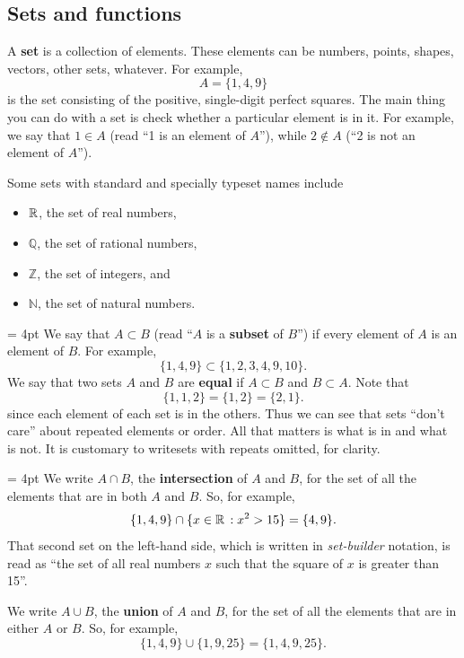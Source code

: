 \documentclass[prettycode,shellescape]{watsonbook}
\begin{document}
\subsection{Sets and functions}  \label{a:setsandfunctions}

A \textbf{set} is a collection of elements. These elements can be
numbers, points, shapes, vectors, other sets, whatever. For example,
\[
  A = \{1,4,9\} 
\]
is the set consisting of the positive, single-digit perfect
squares. The main thing you can do with a set is check whether a
particular element is in it. For example, we say that $1 \in A$ (read
``1 is an element of $A$''), while $2 \notin A$ (``2 is not an element
of $A$'').

\vspace{-8pt}

Some sets with standard and specially typeset names include 
\begin{itemize}[topsep=-6pt]
\item $\mathbb{R}$, the set of real numbers, 
\item $\mathbb{Q}$, the set of rational numbers, 
\item $\mathbb{Z}$, the set of integers, and 
\item $\mathbb{N}$, the set of natural numbers. 
\end{itemize}

\begin{tcolorbox}[title = Subsets and set equality, parbox = false,
  colframe = MidnightBlue, colback=softblue] \parskip = 4pt
  We say that $A \subset B$ (read ``$A$ is a \textbf{subset} of $B$'')
  if every element of $A$ is an element of $B$. For example,
  \[
    \{1,4,9\} \subset \{1,2,3,4,9,10\}. 
  \]
  We say that two sets $A$ and $B$ are \textbf{equal} if $A\subset B$ and $B\subset A$. Note that 
  \[
    \{1,1,2\} = \{1,2\} = \{2,1\} . 
  \]
  since each element of each set is in the others. Thus we can see that
  sets ``don't care'' about repeated elements or order. All that
matters is what is in and what is not. It is customary to writesets with
  repeats omitted, for clarity.
\end{tcolorbox} \enlargethispage{1cm} 

\begin{tcolorbox}[title = Intersections and unions, parbox = false,
  colframe = MidnightBlue, colback=softblue] \parskip = 4pt
  We write $A\cap B$, the \textbf{intersection} of $A$ and $B$, for
  the set of all the elements that are in both $A$ and $B$. So, for
  example,
  \[
    \{1,4,9\} \cap \{ x \in \mathbb{R} \,: x^2 > 15 \} = \{4,9\}. 
  \]
  That second set on the left-hand side, which is written in
  \textit{set-builder} notation, is read as ``the set of all real
  numbers $x$ such that the square of $x$ is greater than 15''.

  We write $A\cup B$, the \textbf{union} of $A$ and $B$, for the set
  of all the elements that are in either $A$ or $B$. So, for example,
  \[
    \{1,4,9\} \cup \{1,9,25\} = \{1,4,9,25\}. 
  \]
\end{tcolorbox}
\end{document}
